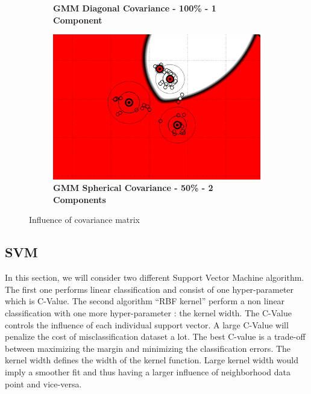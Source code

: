 \begin{figure} [ht]
\begin{subfigure}[h]{0.3\textwidth}
	\caption{\bf GMM Diagonal Covariance - 100\% - 1 Component}
    \end{subfigure}
    \hspace{3mm}
    \begin{subfigure}[h]{0.3\textwidth}
    \centering
    \includegraphics[height=0.08\textheight]{./classification/gmm_spherical_cov_50pourcent_2gmm.png}
	\caption{\bf GMM Spherical Covariance - 50\% - 2 Components}
    \end{subfigure}

\caption{Influence of covariance matrix}
\label{fig:covariance_influence}
\end{figure}



\subsection{SVM}

In this section, we will consider two different Support Vector Machine algorithm. The first one performs linear classification and consist of one hyper-parameter which is C-Value. The second algorithm “RBF kernel” perform a non linear classification with one more hyper-parameter : the kernel width. The C-Value controls the influence of each individual support vector. A large C-Value will penalize the cost of misclassification dataset a lot. The best C-value is a trade-off between maximizing the margin and minimizing the classification errors. The kernel width defines the width of the kernel function. Large kernel width would imply a smoother fit and thus having a larger influence of neighborhood data point and vice-versa. 

